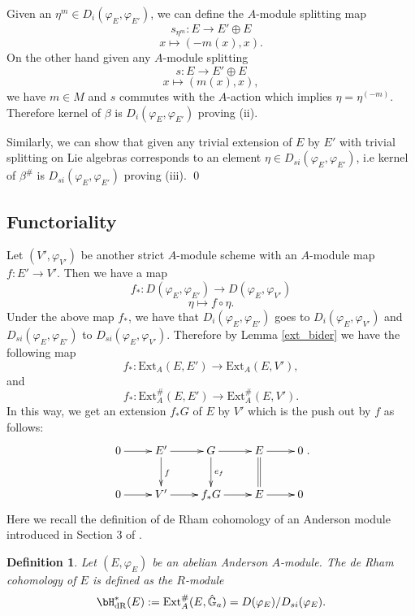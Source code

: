 \documentclass{amsart}
\newtheorem {definition}[theorem]{\bf Definition}
\numberwithin {equation}{section}
\begin{document}
Given an $\eta^{m} \in D_{i}(\varphi_{E},\varphi_{E'})$, we can define the $A$-module splitting map $$s_{\eta^{m}}:E \longrightarrow E'\oplus E $$  $$x \mapsto (-m(x),x).$$ 
On the other hand given any $A$-module splitting 
$$s:E \longrightarrow E'\oplus E $$  $$x \mapsto (m(x),x),$$ 
we have $m\in M$ and $s$ commutes with the $A$-action which implies $\eta=\eta^{(-m)}$. Therefore kernel of $\beta $ is $D_{i}(\varphi_{E},\varphi_{E'})$ proving (ii).\medskip
 
\noindent Similarly, we can show that given any trivial extension of $E$ by $E'$  with trivial splitting on Lie algebras corresponds to an element $\eta \in D_{si}(\varphi_{E},\varphi_{E'})$, i.e kernel of $\beta^{\#}$ is $D_{si}(\varphi_{E},\varphi_{E'})$ proving (iii).
\qed
\subsection{Functoriality}
Let $(V',\varphi_{V'})$ be another strict $A$-module scheme with an $A$-module map $f:E' \longrightarrow V'$. Then we have a map 
$$f_{*}:D(\varphi_{E},\varphi_{E'})\longrightarrow D(\varphi_{E},\varphi_{V'})$$ 
$$\eta \mapsto f\circ \eta.$$ 
Under the above map $f_*$, we have that $D_{i}(\varphi_{E},\varphi_{E'})$ goes to $D_{i}(\varphi_{E},\varphi_{V'})$ and $D_{si}(\varphi_{E},\varphi_{E'})$ to $D_{si}(\varphi_{E},\varphi_{V'})$. Therefore by Lemma \ref{ext_bider}  we have the following map 
\begin{equation*}
f_{*}:  \mathrm{Ext}_{A}(E,E') \longrightarrow  \mathrm{Ext}_{A}(E,V'),
\end{equation*}
and 
\begin{equation*}
f_{*}: \mathrm{Ext}^{\#}_{A}(E,E')\longrightarrow  \mathrm{Ext}^{\#}_{A}(E,V').
\end{equation*}
In this way, we get an extension $f_{*}G$ of $E$ by $V'$ which is the push out by $f$ as follows:
\begin{align}\label{pushout}
\xymatrix{
0  \ar[r] &E' \ar[d]^{f} \ar[r] &G \ar[d]^{e_{f}} \ar[r] &E \ar@{=}[d] \ar[r]&0 \\
0 \ar[r] &V' \ar[r] &f_{*}G \ar[r] & E \ar[r] &0}.
\end{align}
Here we recall the definition of de Rham cohomology of an Anderson module introduced in Section 3 of \cite{BrPa}.
\begin{definition}\label{deRhamdef} Let $(E,\varphi_{E})$ be an abelian Anderson $A$-module. The de Rham cohomology of $E$ is defined as the $R$-module 
\begin{equation*}
\bH^{*}_{\mathrm{dR}}({E}):
=\mathrm{Ext}^{\#}_{A}(E,\hat{\mathbb{G}}_{a})=D(\varphi_{E})/D_{si}(\varphi_{E}).
\end{equation*}
\end{definition}
\end{document}
